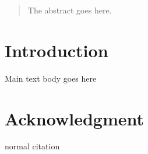 \begin{abstract}
The abstract goes here.
\end{abstract}


\section{Introduction}
Main text body goes here

\section*{Acknowledgment}
normal citation~\cite{Byme:curtmola10} 


